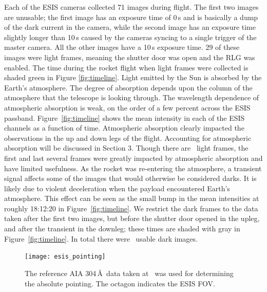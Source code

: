 		Each of the ESIS cameras collected 71 images during flight.  
		The first two images are unusable; the first image has an exposure time of 0\,s and is basically a dump of the dark current in the camera, while the second image has an exposure time slightly longer than 10\,s caused by the cameras syncing to a single trigger of the master camera.  
		All the other images have a 10\,s exposure time. 
		29 of these images were light frames, meaning the shutter door was open and the RLG was enabled. 
		The time during the rocket flight when light frames were collected is shaded green in Figure \ref{fig:timeline}.  
		Light emitted by the Sun is absorbed by the Earth's atmosphere.  
		The degree of absorption depends upon the column of the atmosphere that the telescope is looking through. The wavelength dependence of atmospheric absorption is weak, on the order of a few percent across the ESIS passband.  
		Figure~\ref{fig:timeline} shows the mean intensity in each of the ESIS channels as a function of time.  Atmospheric absorption clearly impacted the observations in the up and down legs of the flight.  
		Accounting for atmospheric absorption will be discussed in Section 3.  
		Though there are \numDataFrames\ light frames, the first and last several frames were greatly impacted by atmospheric absorption and have limited usefulness.  As the rocket was re-entering the atmosphere, a transient signal affects some of the images that would otherwise be considered darks.  It is likely due to violent deceleration when the payload encountered Earth's atmosphere.
		This effect can be seen as the small bump in the mean intensities at roughly 18:12:20 in Figure~\ref{fig:timeline}.  
		We restrict the dark frames to the data taken after the first two images, but before the shutter door opened in the upleg, and after the transient in the downleg; these times are shaded with gray in Figure~\ref{fig:timeline}.  
		In total there were \numDarkFrames\ usable dark images.  
		
		
		
		\begin{figure}[ht]
			\begin{center}
				\texttt{[image: esis\_pointing]}
				\caption{The reference AIA 304\,\AA\ data taken at \aianearapogee \ was used for determining the absolute pointing. The octagon indicates the ESIS FOV.}
				\label{fig:fov}
			\end{center}
		\end{figure}
	

